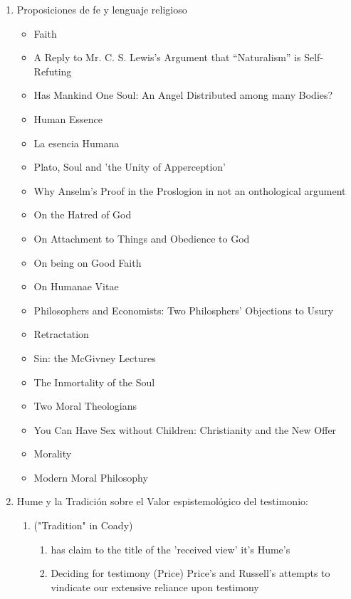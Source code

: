 \documentclass[11pt]{article}
\begin{document}
\begin{enumerate}
\item Proposiciones de fe y lenguaje religioso
\label{sec-4-1-3-3}
\begin{itemize}
\item Faith
\item A Reply to Mr. C. S. Lewis's Argument that “Naturalism” is Self- Refuting
\item Has Mankind One Soul: An Angel Distributed among many Bodies?
\item Human Essence
\item La esencia Humana
\item Plato, Soul and 'the Unity of Apperception'
\item Why Anselm's Proof in the Proslogion in not an onthological argument
\item On the Hatred of God
\item On Attachment to Things and Obedience to God
\item On being on Good Faith
\item On Humanae Vitae
\item Philosophers and Economists: Two Philosphers' Objections to Usury
\item Retractation
\item Sin: the McGivney Lectures
\item The Inmortality of the Soul
\item Two Moral Theologians
\item You Can Have Sex without Children: Christianity and the New Offer
\item Morality
\item Modern Moral Philosophy
\end{itemize}

\item Hume y la Tradición sobre el Valor espistemológico del testimonio:
\label{sec-4-1-3-4}

\begin{enumerate}
\item ("Tradition" in Coady)
\label{sec-4-1-3-4-1}
\begin{enumerate}
\item\relax [Testimony and Observation: The reductive approach
\label{sec-4-1-3-4-1-1}
If any view [about testimony] has claim to the title of the 'received view' it's Hume's

\item Deciding for testimony (Price)
\label{sec-4-1-3-4-1-2}
Price's and Russell's attempts to vindicate our extensive reliance upon testimony


\end{enumerate}
\end{enumerate}
\end{enumerate}
\end{document}
